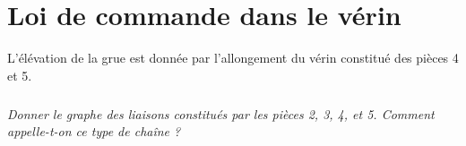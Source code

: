 \documentclass[10pt,oneside]{article}
\begin{document}
{%


}
\section{Loi de commande dans le vérin}

L'élévation de la grue est donnée par l'allongement du vérin constitué des pièces 4 et 5. 

\subparagraph{}
\textit{Donner le graphe des liaisons constitués par les pièces 2, 3, 4, et 5. Comment appelle-t-on ce type de chaîne ?}


\end{document}

